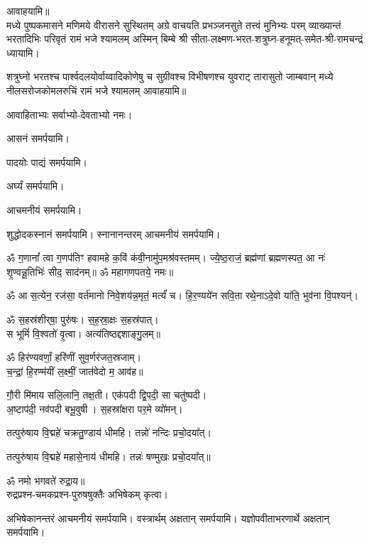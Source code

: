 \begin{center}
आवाहयामि॥\\

{मध्ये पुष्पकमासने मणिमये वीरासने सुस्थितम्}
{अग्रे वाचयति प्रभञ्जनसुते तत्त्वं मुनिभ्यः परम्}
{व्याख्यान्तं भरतादिभिः परिवृतं रामं भजे श्यामलम्}
अस्मिन् बिम्बे श्री सीता-लक्ष्मण-भरत-शत्रुघ्न-हनूमत्-समेत-श्री-रामचन्द्रं ध्यायामि। 

{शत्रुघ्नो भरतश्च पार्श्वदलयोर्वाय्वादिकोणेषु च}
{सुग्रीवश्च विभीषणश्च युवराट् तारासुतो जाम्बवान्}
{मध्ये नीलसरोजकोमलरुचिं रामं भजे श्यामलम्}
आवाहयामि॥\\\medskip

आवाहिताभ्यः सर्वाभ्यो-देवताभ्यो नमः।

आसनं समर्पयामि।

पादयोः पाद्यं समर्पयामि।

अर्घ्यं समर्पयामि।

आचमनीयं समर्पयामि।

शुद्धोदकस्नानं समर्पयामि। स्नानानन्तरम् आचमनीयं समर्पयामि।



ॐ ग॒णानां᳚ त्वा ग॒णप॑तिꣳ हवामहे क॒विं क॑वी॒नामु॑प॒मश्र॑\-वस्तमम्। 
ज्ये॒ष्ठ॒राजं॒ ब्रह्म॑णां ब्रह्मणस्पत॒ आ नः॑ शृ॒ण्वन्नू॒तिभिः॑ सीद॒ साद॑नम्॥ 
ॐ महागणपतये॒ नमः॥ 

ॐ आ स॒त्येन॒ रज॑सा॒ वर्त॑मानो निवे॒शय॑न्न॒मृतं॒ मर्त्यं॑ च। हि॒र॒ण्यये॑न सवि॒ता रथे॒नाऽदे॒वो या॑ति॒ भुव॑ना वि॒पश्यन्॑।

ॐ स॒हस्र॑शीर्‌षा॒ पुरु॑षः। स॒ह॒स्रा॒क्षः स॒हस्र॑पात्।\\
स भूमिं॑ वि॒श्वतो॑ वृ॒त्वा। अत्य॑तिष्ठद्दशाङ्गु॒लम्॥

ॐ हिर॑ण्यवर्णां॒ हरि॑णीं सुव॒र्णर॑जत॒स्रजाम्।\\
च॒न्द्रां॒ हि॒रण्म॑यीं ल॒क्ष्मीं॒ जात॑वेदो म॒ आव॑ह॥

गौ॒री मि॑माय सलि॒लानि॒ तक्ष॒ती। एक॑पदी द्वि॒पदी॒ सा चतु॑ष्पदी।\\
अ॒ष्टाप॑दी॒ नव॑पदी बभू॒वुषी। स॒हस्रा᳚क्षरा पर॒मे व्यो॑मन्।

तत्पुरु॑षाय वि॒द्महे॑ चक्रतु॒ण्डाय॑ धीमहि। तन्नो॑ नन्दिः प्रचो॒दया᳚त्। 

तत्पुरु॑षाय वि॒द्महे॑ महासे॒नाय॑ धीमहि। तन्नः॑ षण्मुखः प्रचो॒दया᳚त्॥


ॐ नमो भगवते॑ रुद्रा॒य॥\\
रुद्रप्रश्न-चमकप्रश्न-पुरुषषुक्तैः अभिषेकम् कृत्वा।

अभिषेकानन्तरं आचमनीयं समर्पयामि। वस्त्रार्थम् अक्षतान् समर्पयामि। यज्ञोपवीताभरणार्थे अक्षतान् समर्पयामि।


\end{center}

